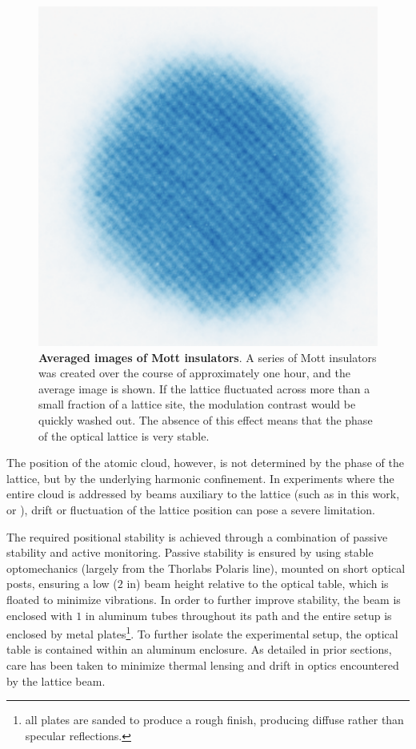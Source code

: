 \documentclass[twocolumn,aps,pra,showpacs,preprintnumbers,bibnotes]{revtex4-1}
\begin{document}
\begin{figure}
  \begin{center}
    \includegraphics[width=\columnwidth]{fig/averaged_mott.png}
    \caption{\textbf{Averaged images of Mott insulators}. A series of Mott insulators was created over the course of approximately one hour, and the average image is shown\cite{Greif2016}. If the lattice fluctuated across more than a small fraction of a lattice site, the modulation contrast would be quickly washed out. The absence of this effect means that the phase of the optical lattice is very stable.}\label{fig:averaged_mott}
  \end{center}
\end{figure}


The position of the atomic cloud, however, is not determined by the phase of the lattice, but by the underlying harmonic confinement. 
In experiments where the entire cloud is addressed by beams auxiliary to the lattice (such as in this work, \cite{Mazurenko2016} or \cite{Choi2016}), drift or fluctuation of the lattice position can pose a severe limitation.

The required positional stability is achieved through a combination of passive stability and active monitoring. 
Passive stability is ensured by using stable optomechanics (largely from the Thorlabs Polaris line), mounted on short optical posts, ensuring a low ($2$ in) beam height relative to the optical table, which is floated to minimize vibrations.
In order to further improve stability, the beam is enclosed with $1$ in aluminum tubes throughout its path and the entire setup is enclosed by metal plates\footnote{all plates are sanded to produce a rough finish, producing diffuse rather than specular reflections.}.
To further isolate the experimental setup, the optical table is contained within an aluminum enclosure. As detailed in prior sections, care has been taken to minimize thermal lensing and drift in optics encountered by the lattice beam.
\end{document}
